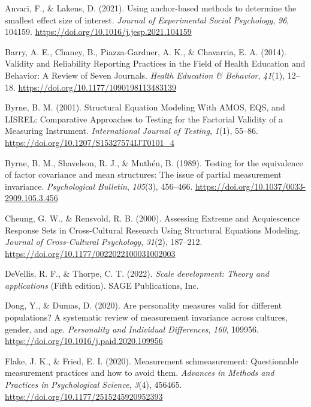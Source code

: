 \documentclass[
  man]{apa7}
\newlength{\cslhangindent}
\newlength{\cslentryspacingunit} %
\newenvironment{CSLReferences}[2] %
 {%
  \setlength{\parindent}{0pt}
  \ifodd #1
  \let\oldpar\par
  \def\par{\hangindent=\cslhangindent\oldpar}
  \fi
  \setlength{\parskip}{#2\cslentryspacingunit}
 }%
 {}
\begin{document}
\hypertarget{refs}{}
\begin{CSLReferences}{1}{0}
\leavevmode{}%
Anvari, F., \& Lakens, D. (2021). Using anchor-based methods to determine the smallest effect size of interest. \emph{Journal of Experimental Social Psychology}, \emph{96}, 104159. \url{https://doi.org/10.1016/j.jesp.2021.104159}

\leavevmode{}%
Barry, A. E., Chaney, B., Piazza-Gardner, A. K., \& Chavarria, E. A. (2014). Validity and Reliability Reporting Practices in the Field of Health Education and Behavior: A Review of Seven Journals. \emph{Health Education \& Behavior}, \emph{41}(1), 12--18. \url{https://doi.org/10.1177/1090198113483139}

\leavevmode{}%
Byrne, B. M. (2001). Structural Equation Modeling With AMOS, EQS, and LISREL: Comparative Approaches to Testing for the Factorial Validity of a Measuring Instrument. \emph{International Journal of Testing}, \emph{1}(1), 55--86. \url{https://doi.org/10.1207/S15327574IJT0101_4}

\leavevmode{}%
Byrne, B. M., Shavelson, R. J., \& Muthén, B. (1989). Testing for the equivalence of factor covariance and mean structures: The issue of partial measurement invariance. \emph{Psychological Bulletin}, \emph{105}(3), 456--466. \url{https://doi.org/10.1037/0033-2909.105.3.456}

\leavevmode{}%
Cheung, G. W., \& Rensvold, R. B. (2000). Assessing Extreme and Acquiescence Response Sets in Cross-Cultural Research Using Structural Equations Modeling. \emph{Journal of Cross-Cultural Psychology}, \emph{31}(2), 187--212. \url{https://doi.org/10.1177/0022022100031002003}

\leavevmode{}%
DeVellis, R. F., \& Thorpe, C. T. (2022). \emph{Scale development: Theory and applications} (Fifth edition). SAGE Publications, Inc.

\leavevmode{}%
Dong, Y., \& Dumas, D. (2020). Are personality measures valid for different populations? A systematic review of measurement invariance across cultures, gender, and age. \emph{Personality and Individual Differences}, \emph{160}, 109956. \url{https://doi.org/10.1016/j.paid.2020.109956}

\leavevmode{}%
Flake, J. K., \& Fried, E. I. (2020). Measurement schmeasurement: Questionable measurement practices and how to avoid them. \emph{Advances in Methods and Practices in Psychological Science}, \emph{3}(4), 456465. \url{https://doi.org/10.1177/2515245920952393}


\end{CSLReferences}
\end{document}
